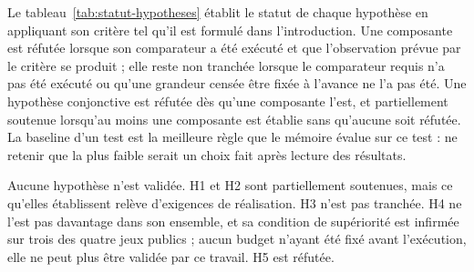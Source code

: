 
Le tableau~\ref{tab:statut-hypotheses} établit le statut de chaque hypothèse en appliquant son critère tel qu'il est formulé dans l'introduction. Une composante est réfutée lorsque son comparateur a été exécuté et que l'observation prévue par le critère se produit ; elle reste non tranchée lorsque le comparateur requis n'a pas été exécuté ou qu'une grandeur censée être fixée à l'avance ne l'a pas été. Une hypothèse conjonctive est réfutée dès qu'une composante l'est, et partiellement soutenue lorsqu'au moins une composante est établie sans qu'aucune soit réfutée. La baseline d'un test est la meilleure règle que le mémoire évalue sur ce test : ne retenir que la plus faible serait un choix fait après lecture des résultats.

Aucune hypothèse n'est validée. H1 et H2 sont partiellement soutenues, mais ce qu'elles établissent relève d'exigences de réalisation. H3 n'est pas tranchée. H4 ne l'est pas davantage dans son ensemble, et sa condition de supériorité est infirmée sur trois des quatre jeux publics ; aucun budget n'ayant été fixé avant l'exécution, elle ne peut plus être validée par ce travail. H5 est réfutée.

